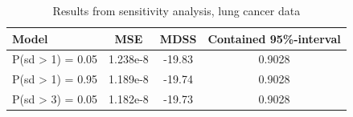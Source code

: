 \begin{table}
    \begin{center}
        \begin{tabular}{l |c c c }
        Model & MSE &   MDSS & Contained 95\%-interval\\
        \hline
        P(sd > 1) = 0.05 & 1.238e-8 & -19.83    & 0.9028 \\
        P(sd > 1) = 0.95 & 1.189e-8 & -19.74    & 0.9028 \\
        P(sd > 3) = 0.05 & 1.182e-8 & -19.73    & 0.9028 \\
        \end{tabular}
    \caption{Results from sensitivity analysis, lung cancer data}\label{tbl:mv-sensitivity-lung}
    \end{center}
\end{table}

\newpage
